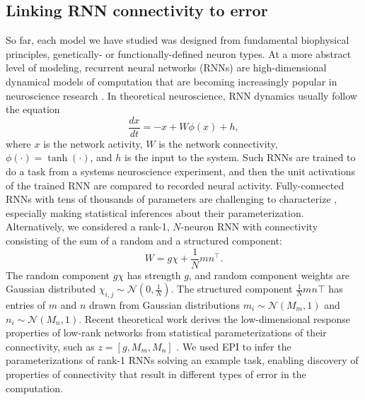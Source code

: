 \documentclass[11pt]{article}
\begin{document}
\subsection{Linking RNN connectivity to error} \label{results_RNN}
So far, each model we have studied was designed from fundamental biophysical principles, genetically- or functionally-defined neuron types.  
At a more abstract level of modeling, recurrent neural networks (RNNs) are high-dimensional dynamical models of computation that are becoming increasingly popular in neuroscience research \cite{barak2017recurrent}. 
In theoretical neuroscience, RNN dynamics usually follow the equation
\begin{equation}
\frac{dx}{dt} = -x + W \phi(x) + h,
\end{equation}
where $x$ is the network activity, $W$ is the network connectivity, $\phi(\cdot) = \tanh(\cdot)$, and $h$ is the input to the system.
Such RNNs are trained to do a task from a systems neuroscience experiment, and then the unit activations of the trained RNN are compared to recorded neural activity.
Fully-connected RNNs with tens of thousands of parameters are challenging to characterize \cite{sussillo2013opening}, especially making statistical inferences about their parameterization.
Alternatively, we considered a rank-1, $N$-neuron RNN with connectivity consisting of the sum of a random and a structured component:
\begin{equation}
W = g\chi + \frac{1}{N}mn^\top.
\end{equation}
The random component $g \chi$ has strength $g$, and random component weights are Gaussian distributed $\chi_{i,j} \sim \mathcal{N}(0, \frac{1}{N})$.  
The structured component $\frac{1}{N}m n\top$ has entries of $m$ and $n$ drawn from Gaussian distributions $m_i \sim \mathcal{N}(M_m, 1)$ and $n_i \sim \mathcal{N}(M_n, 1)$.
Recent theoretical work derives the low-dimensional response properties of low-rank networks from statistical parameterizations of their connectivity, such as $z = [g, M_m, M_n]$ \cite{mastrogiuseppe2018linking}.
We used EPI to infer the parameterizations of rank-1 RNNs solving an example task, enabling discovery of properties of connectivity that result in different types of error in the computation.
\end{document}
